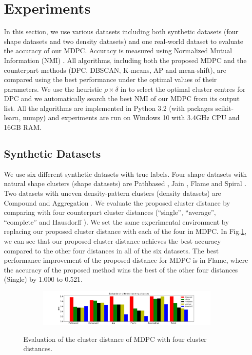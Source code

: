\documentclass{llncs}
\begin{document}
\section{Experiments}
In this section, we use various datasets including both synthetic datasets (four shape datasets and two density datasets) and one real-world dataset to evaluate the accuracy of our MDPC. Accuracy is measured using Normalized Mutual Information (NMI) \cite{nmi}. All algorithms, including both the proposed MDPC and the counterpart methods (DPC, DBSCAN, K-means, AP and mean-shift), are compared using the best performance under the optimal values of their parameters. We use the heuristic $\rho \times \delta$ in \cite{dp} to select the optimal cluster centres for DPC and we automatically search the best NMI of our MDPC from its output list. All the algorithms are implemented in Python 3.2 (with packages scikit-learn, numpy) and experiments are run on Windows 10 with 3.4GHz CPU and 16GB RAM. 
%
\subsection{Synthetic Datasets}
We use six different synthetic datasets with true labels. Four shape datasets with natural shape clusters (shape datasets) are Pathbased \cite{pathbased}, Jain \cite{jain}, Flame \cite{flame} and Spiral \cite{pathbased}. Two datasets with uneven density-pattern clusters (density datasets) are Compound \cite{compound} and Aggregation \cite{aggregation}. We evaluate the proposed cluster distance by comparing with four counterpart cluster distances (``single'', ``average'', ``complete'' and Hausdorff \cite{hausdorff}). We set the same experimental environment by replacing our proposed cluster distance with each of the four in MDPC. In Fig.\ref{fig:dist}, we can see that our proposed cluster distance achieves the best accuracy compared to the other four distances in all of the six datasets. The best performance improvement of the proposed distance for MDPC is in Flame, where the accuracy of the proposed method
wins the best of the other four distances (Single) by 1.000 to 0.521.
\begin{figure}[ht]
\vspace*{-.4cm}
\centering
\begin{subfigure}[t]{1\textwidth}
\centering
\includegraphics[width=1\textwidth]{image/distances.png}
\end{subfigure}
\caption{Evaluation of the cluster distance of MDPC with four cluster distances.}
\label{fig:dist}
\end{figure}
\end{document}
